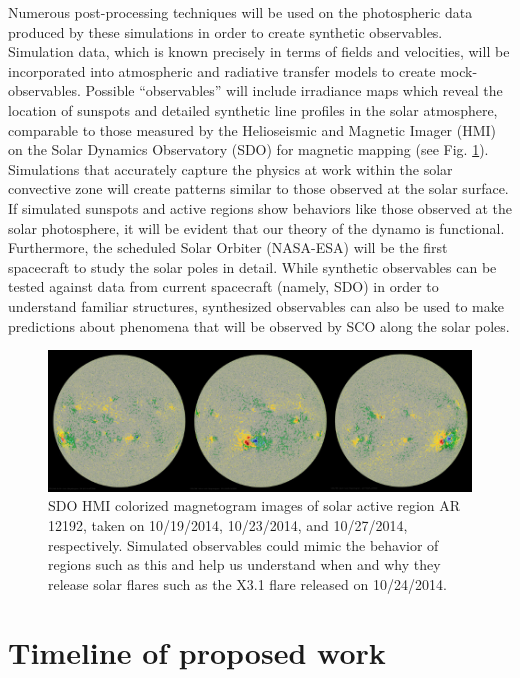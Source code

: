 \documentclass[aasms,12pt]{article}
\begin{document}
Numerous post-processing techniques will be used on the photospheric data 
produced by these simulations in order to create synthetic observables.
Simulation data, which is known precisely in terms of fields and velocities, 
will be incorporated into atmospheric and radiative transfer models to create
mock-observables.  Possible ``observables'' will
include irradiance maps which reveal the location of sunspots and 
detailed synthetic line profiles in the solar atmosphere, 
comparable to those measured by the Helioseismic and
Magnetic Imager (HMI) on the Solar Dynamics Observatory (SDO) for magnetic 
mapping (see Fig. \ref{AR12192}).  Simulations
that accurately capture the physics at work within the solar convective zone
will create patterns similar to those observed at the solar surface.  If
simulated sunspots and active regions show behaviors like those observed at the
solar photosphere, it will be evident that our
theory of the dynamo is functional.  
Furthermore, the scheduled Solar Orbiter (NASA-ESA)
will be the first spacecraft to study the solar poles in detail.  While
synthetic observables can be tested against data from
current spacecraft (namely, SDO)
in order to understand familiar structures, synthesized
observables can also be used to make predictions about phenomena that will be
observed by SCO along the solar poles. 

\begin{figure}[t!]
\centering
\includegraphics[width=14cm]{figs/2014_oct_sunspots.jpg}
\caption{SDO HMI colorized magnetogram images of solar active region AR 12192, taken
	on 10/19/2014, 10/23/2014, and 10/27/2014, respectively.  Simulated
	observables could mimic the behavior of regions such as this and help
	us understand when and why they release solar flares such as the X3.1
	flare released on 10/24/2014.
	\label{AR12192}}
\end{figure}

\section{Timeline of proposed work}
\end{document}
